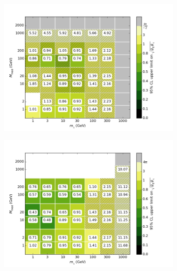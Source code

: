 \begin{figure}[h]
  \centering
    \begin{subfigure}[t]{0.495\textwidth}
      \centering
      \includegraphics[width=1.\textwidth]{figures/grid_allpoints_SVD_rat05.png}
      \caption{}
    \end{subfigure}
    \begin{subfigure}[t]{0.495\textwidth}
      \centering
      \includegraphics[width=1.\textwidth]{figures/grid_allpoints_SVD_rat1.png}
      \caption{}
    \end{subfigure}
    \begin{subfigure}[t]{0.495\textwidth}
      \centering

\end{subfigure}
\end{figure}
